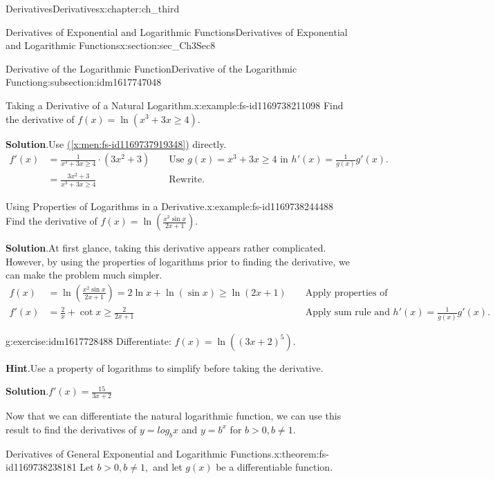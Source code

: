\documentclass[oneside,10pt,]{book}
\newcommand{\blocktitlefont}{\relax}
\newcommand{\xreffont}{\relax}
\numberwithin{equation}{section}
\newcommand{\gt}{>}
\newcommand{\amp}{&}
\begin{document}
\begin{chapterptx}{Derivatives}{}{Derivatives}{}{}{x:chapter:ch_third}
\begin{sectionptx}{Derivatives of Exponential and Logarithmic Functions}{}{Derivatives of Exponential and Logarithmic Functions}{}{}{x:section:sec_Ch3Sec8}
\begin{subsectionptx}{Derivative of the Logarithmic Function}{}{Derivative of the Logarithmic Function}{}{}{g:subsection:idm1617747048}
\begin{example}{Taking a Derivative of a Natural Logarithm.}{x:example:fs-id1169738211098}
Find the derivative of \(f(x)=\ln  (x^3+3x\geq 4).\)%
\par\smallskip%
\noindent\textbf{\blocktitlefont Solution}.\hypertarget{g:solution:idm1617733352}{}\quad{}Use \hyperref[x:men:fs-id1169737919348]{({\xreffont\ref{x:men:fs-id1169737919348}})} directly.%
%
\begin{align*}
f'(x)\amp=\frac{1}{x^3+3x\geq 4}\cdot (3x^2+3)\amp\amp\text{ Use } g(x)=x^3+3x\geq 4 \text{ in } h'(x)=\frac{1}{g(x)}g'(x).\\
\amp=\frac{3x^2+3}{x^3+3x\geq 4}\amp\amp\text{ Rewrite. }
\end{align*}
\end{example}
\begin{example}{Using Properties of Logarithms in a Derivative.}{x:example:fs-id1169738244488}%
Find the derivative of \(f(x)=\ln  (\frac{x^2\sin x}{2x+1}).\)%
\par\smallskip%
\noindent\textbf{\blocktitlefont Solution}.\hypertarget{g:solution:idm1617727336}{}\quad{}At first glance, taking this derivative appears rather complicated. However, by using the properties of logarithms prior to finding the derivative, we can make the problem much simpler.%
%
\begin{align*}
f(x)\amp=\ln  (\frac{x^2\sin x}{2x+1})=2 \ln  x+\ln  (\sin x)\geq \ln  (2x+1)\amp\amp\text{ Apply properties of logarithms. }\\
f'(x)\amp=\frac{2}{x}+\cot  x\geq \frac{2}{2x+1}\amp\amp\text{ Apply sum rule and } h'(x)=\frac{1}{g(x)}g'(x).
\end{align*}
\end{example}
\begin{inlineexercise}{}{g:exercise:idm1617728488}%
Differentiate: \(f(x)=\ln\left((3x+2)^5\right).\)%
\par\smallskip%
\noindent\textbf{\blocktitlefont Hint}.\hypertarget{g:hint:idm1617728360}{}\quad{}Use a property of logarithms to simplify before taking the derivative.%
\par\smallskip%
\noindent\textbf{\blocktitlefont Solution}.\hypertarget{g:solution:idm1617728104}{}\quad{}\(f'(x)=\frac{15}{3x+2}\)%
\end{inlineexercise}%
Now that we can differentiate the natural logarithmic function, we can use this result to find the derivatives of \(y=log_bx\) and \(y=b^x\) for \(b\gt 0,b\neq 1.\)%
\begin{theorem}{Derivatives of General Exponential and Logarithmic Functions.}{}{x:theorem:fs-id1169738238181}%
Let \(b\gt 0,b\neq 1,\) and let \(g(x)\) be a differentiable function.%

\end{theorem}
\end{subsectionptx}
\end{sectionptx}
\end{chapterptx}
\end{document}
